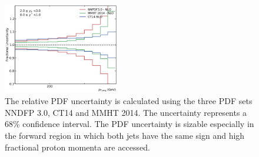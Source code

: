 \begin{figure}[htp]
    \includegraphics[width=0.45\textwidth]{figures/theory/pdf_unc_comparison_yb2ys0.pdf}
    \caption[PDF uncertainty]{The relative PDF uncertainty is calculated using the three PDF sets
    NNDFP 3.0, CT14 and MMHT 2014. The uncertainty represents a 68\% confidence
    interval. The PDF uncertainty is sizable especially in the forward region in
    which both jets have the same sign and high fractional proton momenta are
    accessed. }
    \label{fig:pdf_uncertainties}
\end{figure}

